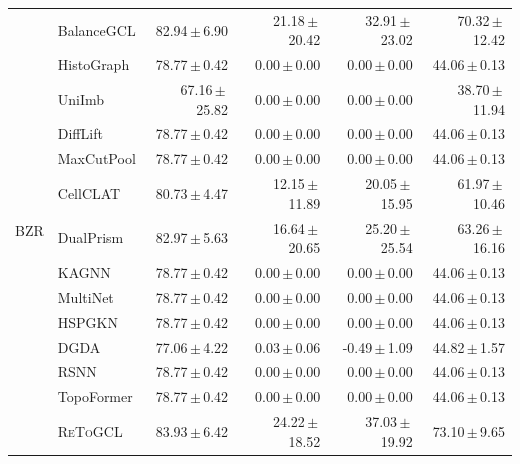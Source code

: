 \documentclass[10pt,twocolumn]{article}
\newcommand{\method}{\textsc{ReToGCL}}
\newcommand{\res}[2]{#1\,$\pm$\,#2}
\begin{document}
\begin{longtable}{@{}llrrrr@{}}
\multirow{14}{*}{BZR}
& BalanceGCL & \res{82.94}{6.90} & \res{21.18}{20.42} & \res{32.91}{23.02} & \res{70.32}{12.42}\\
& HistoGraph & \res{78.77}{0.42} & \res{0.00}{0.00} & \res{0.00}{0.00} & \res{44.06}{0.13}\\
& UniImb & \res{67.16}{25.82} & \res{0.00}{0.00} & \res{0.00}{0.00} & \res{38.70}{11.94}\\
& DiffLift & \res{78.77}{0.42} & \res{0.00}{0.00} & \res{0.00}{0.00} & \res{44.06}{0.13}\\
& MaxCutPool & \res{78.77}{0.42} & \res{0.00}{0.00} & \res{0.00}{0.00} & \res{44.06}{0.13}\\
& CellCLAT & \res{80.73}{4.47} & \res{12.15}{11.89} & \res{20.05}{15.95} & \res{61.97}{10.46}\\
& DualPrism & \res{82.97}{5.63} & \res{16.64}{20.65} & \res{25.20}{25.54} & \res{63.26}{16.16}\\
& KAGNN & \res{78.77}{0.42} & \res{0.00}{0.00} & \res{0.00}{0.00} & \res{44.06}{0.13}\\
& MultiNet & \res{78.77}{0.42} & \res{0.00}{0.00} & \res{0.00}{0.00} & \res{44.06}{0.13}\\
& HSPGKN & \res{78.77}{0.42} & \res{0.00}{0.00} & \res{0.00}{0.00} & \res{44.06}{0.13}\\
& DGDA & \res{77.06}{4.22} & \res{0.03}{0.06} & \res{-0.49}{1.09} & \res{44.82}{1.57}\\
& RSNN & \res{78.77}{0.42} & \res{0.00}{0.00} & \res{0.00}{0.00} & \res{44.06}{0.13}\\
& TopoFormer & \res{78.77}{0.42} & \res{0.00}{0.00} & \res{0.00}{0.00} & \res{44.06}{0.13}\\
\rowcolor{topologypurple!45}& \method{} & \res{83.93}{6.42} & \res{24.22}{18.52} & \res{37.03}{19.92} & \res{73.10}{9.65}\\
\midrule


\end{longtable}
\end{document}
